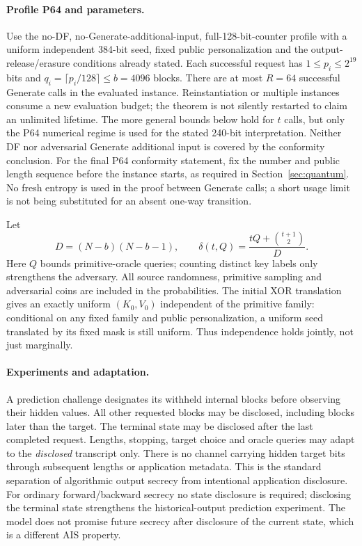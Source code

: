 \documentclass[11 pt,a 4 paper]{article}
\begin{document}
\paragraph{Profile P64 and parameters.} Use the no-DF, no-Generate-additional-input, full-128-bit-counter profile with a uniform independent 384-bit seed, fixed public personalization and the output-release/erasure conditions already stated. Each successful request has $1\leq p_i\leq 2^{19}$ bits and $ q_i=\lceil p_i/128\rceil\leq b=4096$ blocks. There are at most $ R=64$ successful Generate calls in the evaluated instance. Reinstantiation or multiple instances consume a new evaluation budget; the theorem is not silently restarted to claim an unlimited lifetime. The more general bounds below hold for $ t $ calls, but only the P64 numerical regime is used for the stated 240-bit interpretation. Neither DF nor adversarial Generate additional input is covered by the conformity conclusion. For the final P64 conformity statement, fix the number and public length sequence before the instance starts, as required in Section~\ref{sec:quantum}. No fresh entropy is used in the proof between Generate calls; a short usage limit is not being substituted for an absent one-way transition.

Let
\begin{equation}
 D=(N-b)(N-b-1),\qquad
 \delta(t,Q)=\frac{tQ+\binom{t+1}{2}}{D}.\label{eq:delta}
\end{equation}
Here $ Q $ bounds primitive-oracle queries; counting distinct key labels only strengthens the adversary. All source randomness, primitive sampling and adversarial coins are included in the probabilities. The initial XOR translation gives an exactly uniform $(K_0,V_0)$ independent of the primitive family: conditional on any fixed family and public personalization, a uniform seed translated by its fixed mask is still uniform. Thus independence holds jointly, not just marginally.

\paragraph{Experiments and adaptation.} A prediction challenge designates its withheld internal blocks before observing their hidden values. All other requested blocks may be disclosed, including blocks later than the target. The terminal state may be disclosed after the last completed request. Lengths, stopping, target choice and oracle queries may adapt to the \emph{disclosed} transcript only. There is no channel carrying hidden target bits through subsequent lengths or application metadata. This is the standard separation of algorithmic output secrecy from intentional application disclosure. For ordinary forward/backward secrecy no state disclosure is required; disclosing the terminal state strengthens the historical-output prediction experiment. The model does not promise future secrecy after disclosure of the current state, which is a different AIS property.
\end{document}
